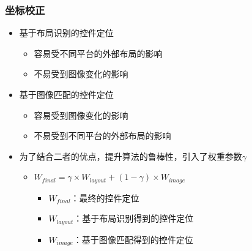 \subsubsection{坐标校正}
\begin{itemize}
    \item 基于布局识别的控件定位
    \begin{itemize}
        \item 容易受不同平台的外部布局的影响
        \item 不易受到图像变化的影响
    \end{itemize}
    \item 基于图像匹配的控件定位
    \begin{itemize}
        \item 容易受到图像变化的影响
        \item 不易受到不同平台的外部布局的影响
    \end{itemize}
    \item 为了结合二者的优点，提升算法的鲁棒性，引入了权重参数$\gamma$
    \begin{itemize}
        \item $W_{final} = \gamma \times W_{layout} + (1-\gamma) \times W_{image}$
        \begin{itemize}
            \item $W_{final}$：最终的控件定位
            \item $W_{layout}$：基于布局识别得到的控件定位
            \item $W_{image}$：基于图像匹配得到的控件定位
        \end{itemize}
    \end{itemize}
\end{itemize}
